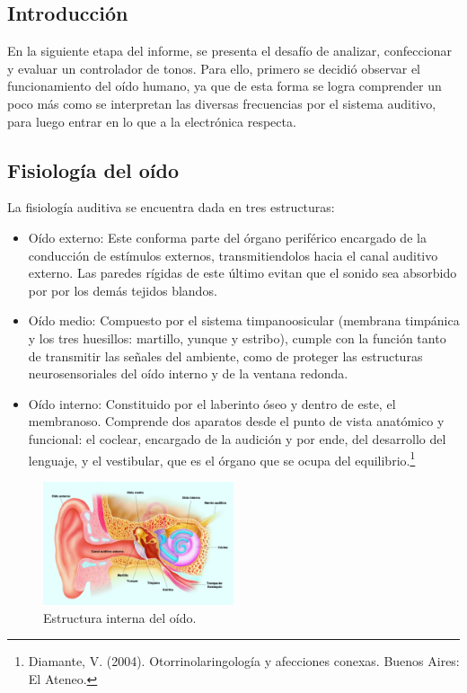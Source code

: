 \subsection{Introducción}

En la siguiente etapa del informe, se presenta el desafío de analizar, confeccionar y evaluar un controlador de tonos. Para ello, primero se decidió observar el funcionamiento del oído humano, ya que de esta forma se logra comprender un poco más como se interpretan las diversas frecuencias por el sistema auditivo, para luego entrar en lo que a la electrónica respecta.

\subsection{Fisiología del oído}

La fisiología auditiva se encuentra dada en tres estructuras:
\begin{itemize}
	\item Oído externo:
	Este conforma parte del órgano periférico encargado de la conducción de estímulos externos, transmitiendolos hacia el canal auditivo externo. Las paredes rígidas de este último evitan que el sonido sea absorbido por por los demás tejidos blandos.
	\item Oído medio:
	Compuesto por el sistema timpanoosicular (membrana timpánica y los tres huesillos: martillo, yunque y estribo), cumple con la función tanto de transmitir las señales del ambiente, como de proteger las estructuras neurosensoriales del oído interno y de la ventana redonda.
	\item Oído interno:
	Constituido por el laberinto óseo y dentro de este, el membranoso. Comprende dos aparatos desde el punto de vista anatómico y funcional: el coclear, encargado de la audición y por ende, del desarrollo del lenguaje, y el vestibular, que es el órgano que se ocupa del equilibrio.\footnote{Diamante, V. (2004). Otorrinolaringología y afecciones conexas. Buenos Aires: El Ateneo.}
\end{itemize}

\begin{figure}[H]
\centering
	\includegraphics[width=0.5\textwidth]{Imagenes/Partes-del-oido.png}
	\caption{Estructura interna del oído.}
	\label{fig:oido}
\end{figure}

